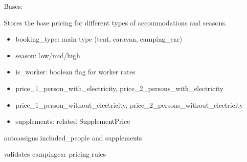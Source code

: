 \documentclass[letterpaper,10pt,english]{sphinxmanual}
\begin{document}
\begin{fulllineitems}
\label{\detokenize{index:bookings.models.Price}}
\pysigstartsignatures
\pysiglinewithargsret
{}
{\sphinxparamcomma {}}
{}
\pysigstopsignatures
\sphinxAtStartPar
Bases: 

\sphinxAtStartPar
Stores the base pricing for different types of accommodations and seasons.
\begin{description}
\begin{itemize}
\item {} 
\sphinxAtStartPar
booking\_type: main type (tent, caravan, camping\_car)

\item {} 
\sphinxAtStartPar
season: low/mid/high

\item {} 
\sphinxAtStartPar
is\_worker: boolean flag for worker rates

\item {} 
\sphinxAtStartPar
price\_1\_person\_with\_electricity, price\_2\_persons\_with\_electricity

\item {} 
\sphinxAtStartPar
price\_1\_person\_without\_electricity, price\_2\_persons\_without\_electricity

\item {} 
\sphinxAtStartPar
supplements: related SupplementPrice

\end{itemize}

\end{description}


\begin{fulllineitems}

\pysigstartsignatures
\pysigline
{}
\pysigstopsignatures
\sphinxAtStartPar
auto\sphinxhyphen{}assigns included\_people and supplements

\end{fulllineitems}



\begin{fulllineitems}

\pysigstartsignatures
\pysigline
{}
\pysigstopsignatures
\sphinxAtStartPar
validates camping\sphinxhyphen{}car pricing rules


\end{fulllineitems}
\end{fulllineitems}
\end{document}
